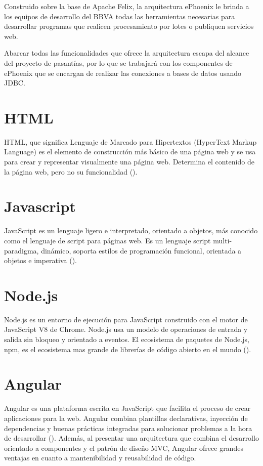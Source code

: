Construido sobre la base de Apache Felix, la arquitectura ePhoenix le brinda a los
equipos de desarrollo del BBVA todas las herramientas necesarias para desarrollar programas
que realicen procesamiento por lotes o publiquen servicios web.

Abarcar todas las funcionalidades que ofrece la arquitectura escapa del alcance del
proyecto de pasantías, por lo que se trabajará con los componentes de ePhoenix
que se encargan de realizar las conexiones a bases de datos usando JDBC.

\section{HTML}

HTML, que significa Lenguaje de Marcado para Hipertextos (HyperText Markup Language)
es el elemento de construcción más básico de una página web y se usa para crear y
representar visualmente una página web. Determina el contenido de la página web,
pero no su funcionalidad (\cite{HTML}).

\section{Javascript}

JavaScript es un lenguaje ligero e interpretado, orientado a objetos, más conocido
como el lenguaje de script para páginas web. Es un lenguaje script multi-paradigma, dinámico,
soporta estilos de programación funcional, orientada a objetos e imperativa (\cite{JS}).

\section{Node.js}
Node.js es un entorno de ejecución para JavaScript construido con el motor de JavaScript V8
de Chrome. Node.js usa un modelo de operaciones de entrada y salida sin bloqueo y orientado a eventos.
El ecosistema de paquetes de Node.js, npm, es el ecosistema mas grande de librerías
de código abierto en el mundo (\cite{NODE}).

\section{Angular}
Angular es una plataforma escrita en JavaScript que facilita el proceso
de crear aplicaciones para la web. Angular combina plantillas declarativas, inyección de dependencias
y buenas prácticas integradas para solucionar problemas a la hora de desarrollar (\cite{ANGULAR}).
Además, al presentar una arquitectura que combina el desarrollo orientado a componentes
y el patrón de diseño MVC, Angular ofrece grandes ventajas en cuanto a mantenibilidad
y reusabilidad de código.

